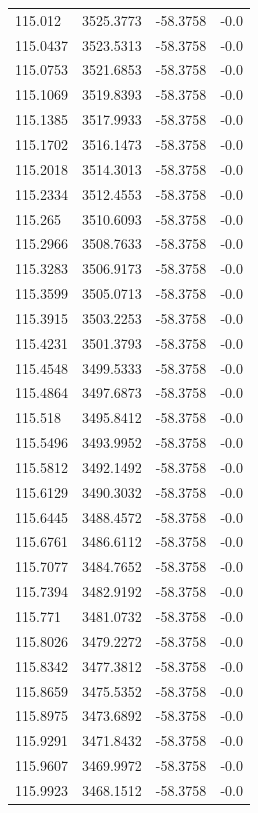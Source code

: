 \begin{table}[H]
\begin{tabular}{llll}
115.012 & 3525.3773 & -58.3758 & -0.0 \\
115.0437 & 3523.5313 & -58.3758 & -0.0 \\
115.0753 & 3521.6853 & -58.3758 & -0.0 \\
115.1069 & 3519.8393 & -58.3758 & -0.0 \\
115.1385 & 3517.9933 & -58.3758 & -0.0 \\
115.1702 & 3516.1473 & -58.3758 & -0.0 \\
115.2018 & 3514.3013 & -58.3758 & -0.0 \\
115.2334 & 3512.4553 & -58.3758 & -0.0 \\
115.265 & 3510.6093 & -58.3758 & -0.0 \\
115.2966 & 3508.7633 & -58.3758 & -0.0 \\
115.3283 & 3506.9173 & -58.3758 & -0.0 \\
115.3599 & 3505.0713 & -58.3758 & -0.0 \\
115.3915 & 3503.2253 & -58.3758 & -0.0 \\
115.4231 & 3501.3793 & -58.3758 & -0.0 \\
115.4548 & 3499.5333 & -58.3758 & -0.0 \\
115.4864 & 3497.6873 & -58.3758 & -0.0 \\
115.518 & 3495.8412 & -58.3758 & -0.0 \\
115.5496 & 3493.9952 & -58.3758 & -0.0 \\
115.5812 & 3492.1492 & -58.3758 & -0.0 \\
115.6129 & 3490.3032 & -58.3758 & -0.0 \\
115.6445 & 3488.4572 & -58.3758 & -0.0 \\
115.6761 & 3486.6112 & -58.3758 & -0.0 \\
115.7077 & 3484.7652 & -58.3758 & -0.0 \\
115.7394 & 3482.9192 & -58.3758 & -0.0 \\
115.771 & 3481.0732 & -58.3758 & -0.0 \\
115.8026 & 3479.2272 & -58.3758 & -0.0 \\
115.8342 & 3477.3812 & -58.3758 & -0.0 \\
115.8659 & 3475.5352 & -58.3758 & -0.0 \\
115.8975 & 3473.6892 & -58.3758 & -0.0 \\
115.9291 & 3471.8432 & -58.3758 & -0.0 \\
115.9607 & 3469.9972 & -58.3758 & -0.0 \\
115.9923 & 3468.1512 & -58.3758 & -0.0 \\

\end{tabular}
\end{table}
